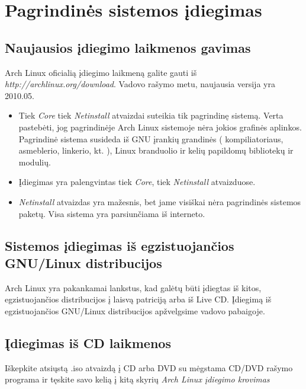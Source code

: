 \chapter{Pagrindinės sistemos įdiegimas}
  \section{Naujausios įdiegimo laikmenos gavimas}

  Arch Linux oficialią įdiegimo laikmeną galite gauti iš
  \textsl{http://archlinux.org/download}. Vadovo rašymo metu,
  naujausia versija yra 2010.05.
  \begin{itemize}
    \item Tiek \textsl{Core} tiek \textsl{Netinstall} atvaizdai
      suteikia tik pagrindinę sistemą. Verta pastebėti, jog
      pagrindinėje Arch Linux sistemoje nėra jokios grafinės
      aplinkos. Pagrindinė sistema susideda iš GNU įrankių grandinės ( kompiliatoriaus,
      asmeblerio, linkerio, kt. ), Linux branduolio ir kelių papildomų
      bibliotekų ir modulių.
    \item Įdiegimas yra palengvintas tiek \textsl{Core}, tiek
      \textsl{Netinstall} atvaizduose.
    \item \textsl{Netinstall} atvaizdas yra mažesnis, bet jame
      visiškai nėra pagrindinės sistemos paketų. Visa sistema yra
      parsiunčiama iš interneto.
  \end{itemize}

  \section{Sistemos įdiegimas iš egzistuojančios GNU/Linux
    distribucijos}

  Arch Linux yra pakankamai lankstus, kad galėtų būti įdiegtas iš
  kitos, egzistuojančios distribucijos į laisvą patriciją arba iš Live
  CD.
  Įdiegimą iš egzistuojančios GNU/Linux distribucijos apžvelgsime
  vadovo pabaigoje.


  \section{Įdiegimas iš CD laikmenos}
  
  Iškepkite atsiųstą .iso atvaizdą į CD arba DVD su mėgstama CD/DVD
  rašymo programa ir tęskite savo kelią į kitą skyrių \textsl{Arch
    Linux įdiegimo krovimas}

